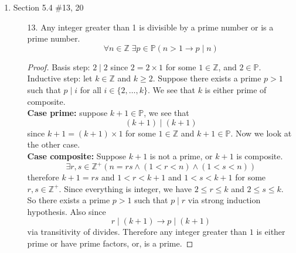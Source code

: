 \documentclass[12pt]{article}
\newcommand{\Z}{\mathbb{Z}}
\newcommand{\paren}[1]{\left( #1 \right)}
\newcommand{\then}{\rightarrow}
\newcommand{\defcomp}{\exists r,s\in \Z^+ \paren{n=rs \wedge \paren{1<r<n} \wedge \paren{1<s<n}}}
\begin{document}
\begin{enumerate}
\begin{proof}
                
            \end{proof}
    \newpage
    \item Section 5.4 \#13, 20
        \begin{enumerate}
            \item[13.] Any integer greater than 1 is divisible by a prime number or is a prime number.
                \[
                \forall n \in \Z \; \exists p \in \mathbb{P} \paren{
                n > 1 \then p \mid n
                }
                \]
                \begin{proof}
                    Basis step: $2 \mid 2$ since $2 = 2\times 1$ for some $1 \in \Z$, and $2 \in \mathbb{P}$.\\
                
                    Inductive step: let $k \in \Z$ and $k \geq 2$. Suppose there exists a prime $p > 1$ such that $p \mid i$ for all $i \in \{ 2,\ldots,k\}$. We see that $k$ is either prime of composite. \\
                    \textbf{Case prime:} suppose $k+1 \in \mathbb{P}$, we see that
                    \[
                    (k+1) \mid (k+1)
                    \]
                    since $ k+1 = (k+1) \times 1$ for some $1 \in \Z$ and $k+1 \in \mathbb{P}$. Now we look at the other case.\\
                    \textbf{Case composite:} Suppose $k+1$ is not a prime, or $k+1$ is composite.
                    \[
                    \defcomp
                    \]
                    therefore $k+1 = rs$ and $1<r<k+1$ and $1<s<k+1$ for some $r,s\in\Z^+$. Since everything is integer, we have $2 \leq r \leq k$ and $2 \leq s \leq k$. So there exists a prime $p>1$ such that $p \mid r$ via strong induction hypothesis. Also since
                    \[
                    r \mid (k+1) \then p \mid (k+1)
                    \]
                    via transitivity of divides. Therefore any integer greater than $1$ is either prime or have prime factors, or, is a prime.
                
                \end{proof}


\end{enumerate}
\end{enumerate}
\end{document}
